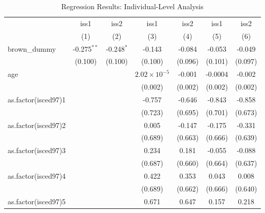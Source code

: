 
\begin{table}[htbp]
   \caption{Regression Results: Individual-Level Analysis}
   \centering
   \begin{tabular}{lcccccc}
      \tabularnewline \midrule \midrule
                          & iss1          & iss2         & iss1                  & iss2    & iss1          & iss2\\  
                          & (1)           & (2)          & (3)                   & (4)     & (5)           & (6)\\  
      brown\_dummy        & -0.275$^{**}$ & -0.248$^{*}$ & -0.143                & -0.084  & -0.053        & -0.049\\   
                          & (0.100)       & (0.100)      & (0.100)               & (0.096) & (0.101)       & (0.097)\\   
      age                 &               &              & $2.02\times 10^{-5}$  & -0.001  & -0.0004       & -0.002\\   
                          &               &              & (0.002)               & (0.002) & (0.002)       & (0.002)\\   
      as.factor(isced97)1 &               &              & -0.757                & -0.646  & -0.843        & -0.858\\   
                          &               &              & (0.723)               & (0.695) & (0.701)       & (0.673)\\   
      as.factor(isced97)2 &               &              & 0.005                 & -0.147  & -0.175        & -0.331\\   
                          &               &              & (0.689)               & (0.663) & (0.666)       & (0.639)\\   
      as.factor(isced97)3 &               &              & 0.234                 & 0.181   & -0.055        & -0.088\\   
                          &               &              & (0.687)               & (0.660) & (0.664)       & (0.637)\\   
      as.factor(isced97)4 &               &              & 0.422                 & 0.353   & 0.043         & 0.008\\   
                          &               &              & (0.689)               & (0.662) & (0.666)       & (0.640)\\   
      as.factor(isced97)5 &               &              & 0.671                 & 0.647   & 0.157         & 0.218\\   

\end{tabular}
\end{table}
